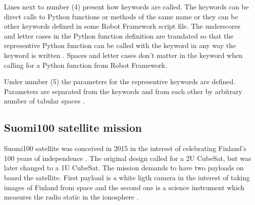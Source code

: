\documentclass[english,12pt,a4paper,pdftex,elec,utf8]{aaltothesis}
\begin{document}
Lines next to number (4) present how keywords are called. The keywords can be direct calls to Python functions or methods of the same name or they can be other keywords defined in some Robot Framework script file. The underscores and letter cases in the Python function definition are translated so that the representive Python function can be called with the keyword in any way the keyword is written \cite{robotuserguide}. Spaces and letter cases don't matter in the keyword when calling for a Python function from Robot Framework.\par 
Under number (5) the parameters for the representive keywords are defined. Parameters are separated from the keywords and from each other by arbitrary number of tabular spaces \cite{robotuserguide}.\par
\subsection{Suomi100 satellite mission}
Suomi100 satellite was conceived in 2015 in the interest of celebrating Finland's 100 years of independence \cite{s1002015}. The original design called for a 2U CubeSat, but was later changed to a 1U CubeSat. The mission demands to have two payloads on board the satellite. First payload is a white ligth camera in the interest of taking images of Finland from space and the second one is a science instrument which measures the radio static in the ionosphere \cite{s1002015, s100blogi}.\par
\end{document}
